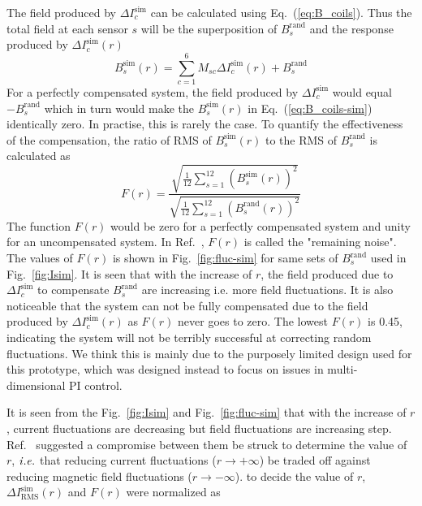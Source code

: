 \FloatBarrier
The field produced by $ \Delta I_c^{\text{sim}}$ can be calculated using Eq.~(\ref{eq:B_coils}). Thus the total field at each sensor $s$ will be the superposition of $B_s^{\text{rand}}$ and the response produced by $ \Delta I_c^{\text{sim}}(r)$ 
\begin{equation}\label{eq:B_coils-sim}
    B_s^{\text{sim}}(r) =\sum_{c=1}^6 M_{sc} \Delta I_c^{\text{sim}}(r) + B_s^{\text{rand}}
\end{equation}
For a perfectly compensated system, the field produced by $ \Delta I_c^{\text{sim}}$ would equal $- B_s^{\text{rand}}$ which in turn would make the $B_s^{\text{sim}}(r)$ in Eq.~(\ref{eq:B_coils-sim}) identically zero. In practise, this is rarely the case. To quantify the effectiveness of the compensation,  the ratio of RMS of $B_s^{\text{sim}}(r)$ to the RMS of $B_s^{\text{rand}}$ is calculated as
\begin{equation}\label{eq:fluc}
    F(r)=\frac{\sqrt{\frac{1}{12} \sum_{s=1}^{12} (B_s^{\text{sim}}(r))^2}}{\sqrt{\frac{1}{12} \sum_{s=1}^{12} (B_s^{\text{rand}}(r))^2}}
\end{equation}
The function $F(r)$ would be zero for a perfectly compensated system and unity for an uncompensated system. In Ref.~\cite{bea}, $F(r)$ is called the "remaining noise". The values of $F(r)$ is shown in Fig.~\ref{fig:fluc-sim} for same sets of $B_s^{\text{rand}}$ used in Fig.~\ref{fig:Isim}. It is seen that with the increase of $r$, the field produced due to $\Delta I_c^{\text{sim}}$ to compensate $B_s^{\text{rand}}$  are increasing i.e. more field fluctuations. It is also noticeable that the system can not be fully compensated due to the field produced by $ \Delta I_c^{\text{sim}}(r)$ as $F(r)$ never goes to zero. The lowest $F(r)$ is 0.45, indicating the system will not be terribly successful at correcting random fluctuations. We think this is mainly due to the purposely limited design used for this prototype, which was designed instead to focus on issues in multi-dimensional PI control.


\FloatBarrier
It is seen from the Fig.~\ref{fig:Isim} and Fig.~\ref{fig:fluc-sim} that with the increase of $r$, current fluctuations are decreasing but field fluctuations are increasing step. Ref.~\cite{bea} suggested a compromise between them be struck to determine the value of $r$, $\it i.e.$ that reducing current fluctuations ($r \rightarrow + \infty$) be traded off against reducing magnetic field fluctuations ($r \rightarrow - \infty$). to decide the value of $r$, $\Delta I_{\text{RMS}}^{\text{sim}}(r)$ and $F(r)$ were normalized as


